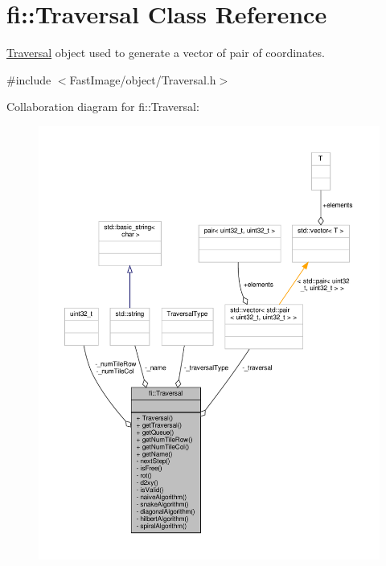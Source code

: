 \hypertarget{classfi_1_1Traversal}{}\section{fi\+:\+:Traversal Class Reference}
\label{classfi_1_1Traversal}


\hyperlink{classfi_1_1Traversal}{Traversal} object used to generate a vector of pair of coordinates.  




{\ttfamily \#include $<$Fast\+Image/object/\+Traversal.\+h$>$}



Collaboration diagram for fi\+:\+:Traversal\+:
\nopagebreak
\begin{figure}[H]
\begin{center}
\leavevmode
\includegraphics[width=350pt]{d3/d29/classfi_1_1Traversal__coll__graph}
\end{center}
\end{figure}
